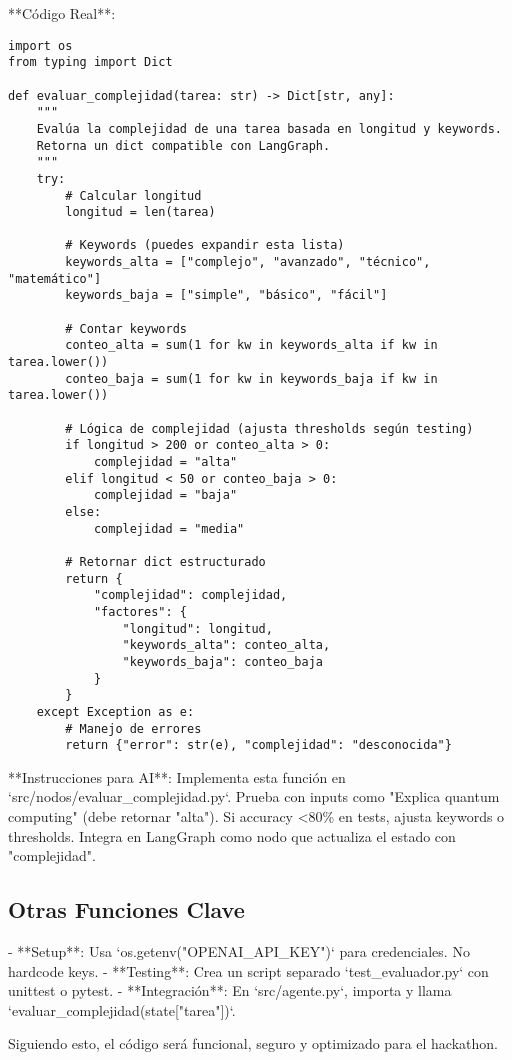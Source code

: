 \documentclass{article}
\begin{document}
**Código Real**:
\begin{lstlisting}
import os
from typing import Dict

def evaluar_complejidad(tarea: str) -> Dict[str, any]:
    """
    Evalúa la complejidad de una tarea basada en longitud y keywords.
    Retorna un dict compatible con LangGraph.
    """
    try:
        # Calcular longitud
        longitud = len(tarea)
        
        # Keywords (puedes expandir esta lista)
        keywords_alta = ["complejo", "avanzado", "técnico", "matemático"]
        keywords_baja = ["simple", "básico", "fácil"]
        
        # Contar keywords
        conteo_alta = sum(1 for kw in keywords_alta if kw in tarea.lower())
        conteo_baja = sum(1 for kw in keywords_baja if kw in tarea.lower())
        
        # Lógica de complejidad (ajusta thresholds según testing)
        if longitud > 200 or conteo_alta > 0:
            complejidad = "alta"
        elif longitud < 50 or conteo_baja > 0:
            complejidad = "baja"
        else:
            complejidad = "media"
        
        # Retornar dict estructurado
        return {
            "complejidad": complejidad,
            "factores": {
                "longitud": longitud,
                "keywords_alta": conteo_alta,
                "keywords_baja": conteo_baja
            }
        }
    except Exception as e:
        # Manejo de errores
        return {"error": str(e), "complejidad": "desconocida"}
\end{lstlisting}

**Instrucciones para AI**: Implementa esta función en `src/nodos/evaluar_complejidad.py`. Prueba con inputs como "Explica quantum computing" (debe retornar "alta"). Si accuracy <80\% en tests, ajusta keywords o thresholds. Integra en LangGraph como nodo que actualiza el estado con "complejidad".

\subsection{Otras Funciones Clave}
- **Setup**: Usa `os.getenv("OPENAI_API_KEY")` para credenciales. No hardcode keys.
- **Testing**: Crea un script separado `test_evaluador.py` con unittest o pytest.
- **Integración**: En `src/agente.py`, importa y llama `evaluar_complejidad(state["tarea"])`.

Siguiendo esto, el código será funcional, seguro y optimizado para el hackathon.
\end{document}
